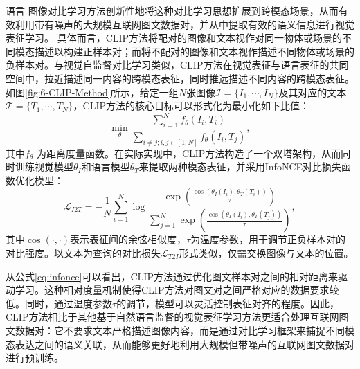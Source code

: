 语言-图像对比学习方法创新性地将这种对比学习思想扩展到跨模态场景，从而有效利用带有噪声的大规模互联网图文数据对，并从中提取有效的语义信息进行视觉表征学习。
具体而言，CLIP方法将配对的图像和文本视作对同一物体或场景的不同模态描述以构建正样本对；而将不配对的图像和文本视作描述不同物体或场景的负样本对。与视觉自监督对比学习类似，CLIP方法在视觉表征与语言表征的共同空间中，拉近描述同一内容的跨模态表征，同时推远描述不同内容的跨模态表征。
如图\ref{fig:6-CLIP-Method}所示，给定一组$N$张图像$\mathcal{I}=\{I_1,\cdots,I_N\}$及其对应的文本$\mathcal{T}=\{T_1,\cdots,T_N\}$，CLIP方法的核心目标可以形式化为最小化如下比值：
\begin{equation}
    \min_{\theta}\frac{\sum_{i=1}^{N}f_{\theta}(I_i,T_i)}{\sum_{i\neq j;i,j\in[1,N]}f_{\theta}(I_i,T_j)},
    \label{eq:instance-level}
\end{equation}
其中$f_{\theta}$ 为距离度量函数。在实际实现中，CLIP方法构造了一个双塔架构，从而同时训练视觉模型$\theta_I$和语言模型$\theta_T$来提取两种模态表征，并采用InfoNCE对比损失函数\cite{oord2018representation}优化模型：
\begin{equation}
 \mathcal{L}_{I2T}=-\frac{1}{N} \sum_{i=1}^{N} \log \frac{\exp \left(\frac{\cos \left(\theta_I(I_{i}), \theta_T(T_{i})\right)}{\tau}\right)}{\sum_{j=1}^{N} \exp \left(\frac{\cos \left(\theta_I(I_{i}), \theta_T(T_{j})\right)}{\tau}\right)},
 \label{eq:infonce}
\end{equation}
其中$\cos(\cdot, \cdot)$表示表征间的余弦相似度，$\tau$为温度参数，用于调节正负样本对的对比强度。以文本为查询的对比损失$\mathcal{L}_{T2I}$形式类似，仅需交换图像与文本的位置。

从公式\eqref{eq:infonce}可以看出，CLIP方法通过优化图文样本对之间的相对距离来驱动学习。这种相对度量机制使得CLIP方法对图文对之间严格对应的数据要求较低。同时，通过温度参数$\tau$的调节，模型可以灵活控制表征对齐的程度。因此，CLIP方法相比于其他基于自然语言监督的视觉表征学习方法更适合处理互联网图文数据对：它不要求文本严格描述图像内容，而是通过对比学习框架来捕捉不同模态表达之间的语义关联，从而能够更好地利用大规模但带噪声的互联网图文数据对进行预训练。

